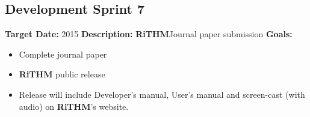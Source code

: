 \documentclass[]{article}
\newcommand{\rithm}{\textbf{RiTHM}\space}
\begin{document}
\subsection{Development Sprint 7}
\textbf{Target Date:}\space {} {2015}\newline
\textbf{Description:} \rithm Journal paper submission \newline
\textbf{Goals:}
\begin{itemize}
	\item
	Complete journal paper
	\item
	\rithm 2.0 public release 
	\item
	Release will include Developer's manual, User's manual and screen-cast (with audio) on \rithm's website.

\end{itemize}
\end{document}
